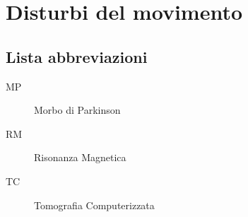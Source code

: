 \chapter{Disturbi del movimento}
\minitoc
\section*{Lista abbreviazioni}
\begin{description}
	\item[MP]{Morbo di Parkinson}
	\item[RM] Risonanza Magnetica
	\item[TC]{Tomografia Computerizzata}
\end{description}





